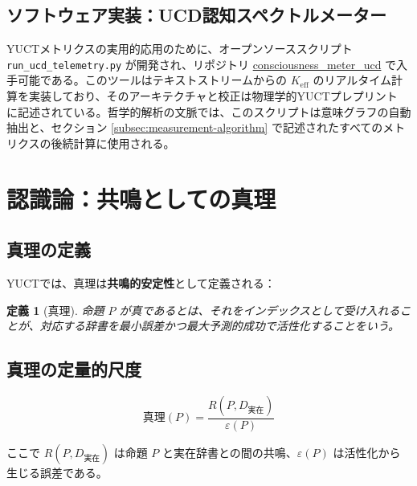 \documentclass[11pt,a4paper]{article}
\newtheorem{definition}{定義}[section]
\newcommand{\eps}{\varepsilon}
\begin{document}
	\subsection{ソフトウェア実装：UCD認知スペクトルメーター}
	\label{subsec:ucd-software}
	
	YUCTメトリクスの実用的応用のために、オープンソーススクリプト \texttt{run\_ucd\_telemetry.py} が開発され、リポジトリ \href{https://github.com/Alexey-Yakushev-YUCT/consciousness_meter_ucd}{consciousness\_meter\_ucd} で入手可能である。このツールはテキストストリームからの \(K_{\mathrm{eff}}\) のリアルタイム計算を実装しており、そのアーキテクチャと校正は物理学的YUCTプレプリント \cite{Yakushev2026b} に記述されている。哲学的解析の文脈では、このスクリプトは意味グラフの自動抽出と、セクション \ref{subsec:measurement-algorithm} で記述されたすべてのメトリクスの後続計算に使用される。
	
	
	\section{認識論：共鳴としての真理}
	
	\subsection{真理の定義}
	
	YUCTでは、真理は\textbf{共鳴的安定性}として定義される：
	
	\begin{definition}[真理]
		命題 \(P\) が真であるとは、それをインデックスとして受け入れることが、対応する辞書を最小誤差かつ最大予測的成功で活性化することをいう。
	\end{definition}
	
	\subsection{真理の定量的尺度}
	
	\begin{equation}
		\text{真理}(P) = \frac{R(P, D_{\text{実在}})}{\eps(P)}
	\end{equation}
	
	ここで \(R(P, D_{\text{実在}})\) は命題 \(P\) と実在辞書との間の共鳴、\(\eps(P)\) は活性化から生じる誤差である。
	
\end{document}
